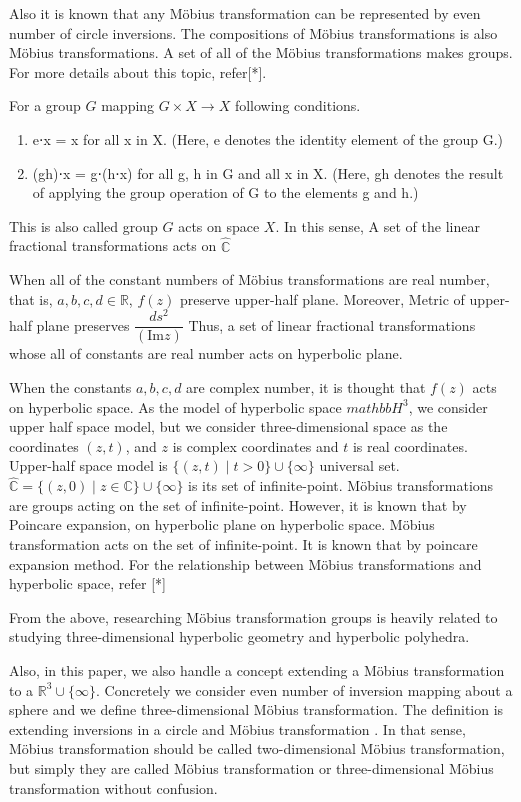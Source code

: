 Also it is known that any M\"obius transformation can be represented by 
even number of circle inversions.
The compositions of M\"obius transformations is also M\"obius
transformations. A set of all of the M\"obius transformations makes
groups. For more details about this topic, refer[*].

For a group $G$ mapping $G \times X \to X$ following conditions.
\begin{enumerate}
 \item e⋅x = x for all x in X. (Here, e denotes the identity element of
       the group G.)
 \item (gh)⋅x = g⋅(h⋅x) for all g, h in G and all x in X. 
       (Here, gh denotes the result of applying the group operation of G to the elements g and h.)
\end{enumerate}

This is also called group $G$ acts on space $X$.
In this sense, A set of the linear fractional transformations acts on 
$\hat{\mathbb{C}}$

When all of the constant numbers of M\"obius transformations are real number,
that is, $a, b, c, d \in \mathbb{R}$, $f(z)$ preserve upper-half plane.
Moreover, Metric of upper-half plane preserves
$\dfrac{ds^2}{(\mathrm{Im}z)}$
Thus, a set of linear fractional transformations whose all of constants
are real number acts on hyperbolic plane.

When the constants $a, b, c, d$ are complex number, it is thought that
$f(z)$ acts on hyperbolic space.
As the model of hyperbolic space $mathbb{H}^3$, we consider upper half
space model, but we consider three-dimensional space as the coordinates
$(z, t)$, and $z$ is complex coordinates and $t$ is real coordinates.
Upper-half space model is $\{(z,t) \mid t>0\}\cup \{ \infty \}$
universal set. 
$\hat{\mathbb{C}} = \{ (z,0) \mid z \in \mathbb{C}\} \cup \{ \infty\}$
is its set of infinite-point. M\"obius transformations are groups acting on
the set of infinite-point. However, it is known that by Poincare
expansion, on hyperbolic plane on hyperbolic space.
M\"obius transformation acts on the set of infinite-point. It is known
that by poincare expansion method.
For the relationship between M\"obius transformations and hyperbolic
space, refer [*]

From the above, researching M\"obius transformation groups is heavily
related to studying three-dimensional hyperbolic geometry and hyperbolic
polyhedra.

Also, in this paper, we also handle a concept extending a M\"obius
transformation to a $\mathbb{R}^3\cup\{\infty\}$.
Concretely we consider even number of inversion mapping about a sphere 
and we define three-dimensional M\"obius transformation.
The definition is extending inversions in a circle and M\"obius
transformation .
In that sense, M\"obius transformation should be called two-dimensional
M\"obius transformation, but
simply they are called M\"obius transformation or three-dimensional M\"obius
transformation without confusion.

